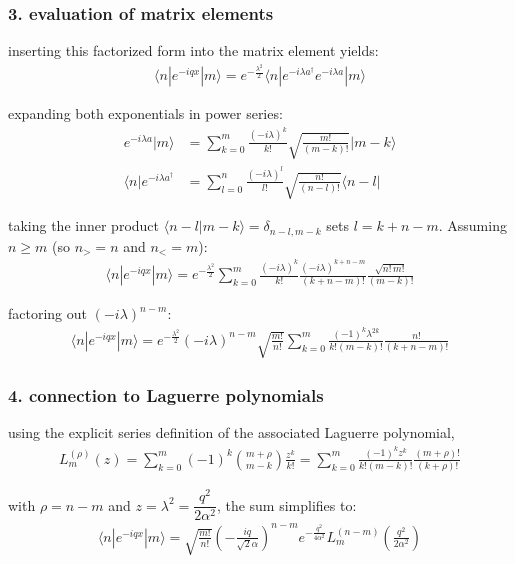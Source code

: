 \subsubsection{3. evaluation of matrix elements}
inserting this factorized form into the matrix element yields:
\begin{align}
  \langle n | e^{-iqx} | m \rangle = e^{-\frac{\lambda^2}{2}} \langle n | e^{-i \lambda a^\dagger} e^{-i \lambda a} | m \rangle
\end{align}

expanding both exponentials in power series:
\begin{align}
  e^{-i \lambda a} |m\rangle          & = \sum_{k=0}^{m} \frac{(-i\lambda)^k}{k!} \sqrt{\frac{m!}{(m-k)!}} |m-k\rangle  \\
  \langle n| e^{-i \lambda a^\dagger} & = \sum_{l=0}^{n} \frac{(-i\lambda)^l}{l!} \sqrt{\frac{n!}{(n-l)!}} \langle n-l|
\end{align}

taking the inner product $\langle n-l | m-k \rangle = \delta_{n-l, m-k}$ sets $l = k + n - m$. Assuming $n \ge m$ (so $n_> = n$ and $n_< = m$):
\begin{align}
  \langle n | e^{-iqx} | m \rangle = e^{-\frac{\lambda^2}{2}} \sum_{k=0}^{m} \frac{(-i\lambda)^k}{k!} \frac{(-i\lambda)^{k + n - m}}{(k + n - m)!} \frac{\sqrt{n!\, m!}}{(m - k)!}
\end{align}

factoring out $(-i\lambda)^{n-m}$:
\begin{align}
  \langle n | e^{-iqx} | m \rangle = e^{-\frac{\lambda^2}{2}} (-i\lambda)^{n-m} \sqrt{\frac{m!}{n!}} \sum_{k=0}^{m} \frac{(-1)^k \lambda^{2k}}{k! (m-k)!} \frac{n!}{(k + n - m)!}
\end{align}

\subsubsection{4. connection to Laguerre polynomials}
using the explicit series definition of the associated Laguerre polynomial,
\begin{align}
  L_m^{(\rho)}(z) = \sum_{k=0}^{m} (-1)^k \binom{m+\rho}{m-k} \frac{z^k}{k!} = \sum_{k=0}^{m} \frac{(-1)^k z^k}{k! (m-k)!} \frac{(m+\rho)!}{(k+\rho)!}
\end{align}

with $\rho = n - m$ and $z = \lambda^2 = \dfrac{q^2 }{2\alpha^2}$, the sum simplifies to:
\begin{align}
  \langle n | e^{-iqx} | m \rangle = \sqrt{\frac{m!}{n!}} \left(-\frac{i q }{\sqrt{2}\alpha }\right)^{n-m} e^{-\frac{q^2 }{4\alpha ^2}} L_m^{(n-m)}\!\left(\frac{q^2 }{2\alpha ^2}\right)
\end{align}

